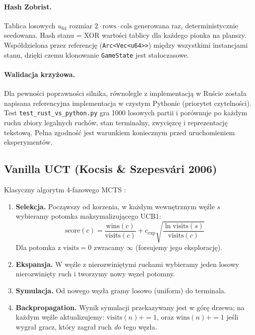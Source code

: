 \paragraph{Hash Zobrist.}
Tablica losowych $u_{64}$ rozmiar $2 \cdot \text{rows} \cdot \text{cols}$
generowana raz, deterministycznie seedowana. Hash stanu = XOR wartości tablicy
dla każdego pionka na planszy. Współdzielona przez referencję
(\texttt{Arc<Vec<u64>>}) między wszystkimi instancjami stanu, dzięki czemu klonowanie
\texttt{GameState} jest stałoczasowe.

\paragraph{Walidacja krzyżowa.}
Dla pewności poprawności silnika, równolegle z implementacją w Ruście została
napisana referencyjna implementacja w czystym Pythonie (priorytet czytelności).
Test \texttt{test\_rust\_vs\_python.py} gra 1000 losowych partii i porównuje
po każdym ruchu zbiory legalnych ruchów, stan terminalny, zwycięzcę i
reprezentację tekstową. Pełna zgodność jest warunkiem koniecznym przed
uruchomieniem eksperymentów.

\subsection{Vanilla UCT (Kocsis \& Szepesvári 2006)}

Klasyczny algorytm 4-fazowego MCTS \cite{kocsis2006bandit}:

\begin{enumerate}[nosep]
    \item \textbf{Selekcja.} Począwszy od korzenia, w każdym wewnętrznym węźle
          $s$ wybieramy potomka maksymalizującego UCB1:
          \begin{equation}
              \text{score}(c) = \frac{\text{wins}(c)}{\text{visits}(c)}
                              + c_{\text{exp}} \sqrt{\frac{\ln \text{visits}(s)}{\text{visits}(c)}}
              \label{eq:ucb1}
          \end{equation}
          Dla potomka z $\text{visits} = 0$ zwracamy $\infty$ (forsujemy
          jego eksplorację).
    \item \textbf{Ekspansja.} W węźle z nierozwiniętymi ruchami wybieramy
          jeden losowy nierozwinięty ruch i tworzymy nowy węzeł potomny.
    \item \textbf{Symulacja.} Od nowego węzła gramy losowo (uniform) do
          terminala.
    \item \textbf{Backpropagation.} Wynik symulacji przekazywany jest
          w górę drzewa; na każdym węźle aktualizujemy:
          $\text{visits}(n) \mathrel{{+}{=}} 1$, oraz
          $\text{wins}(n) \mathrel{{+}{=}} 1$ jeśli wygrał gracz, który zagrał
          ruch \emph{do} tego węzła.
\end{enumerate}


